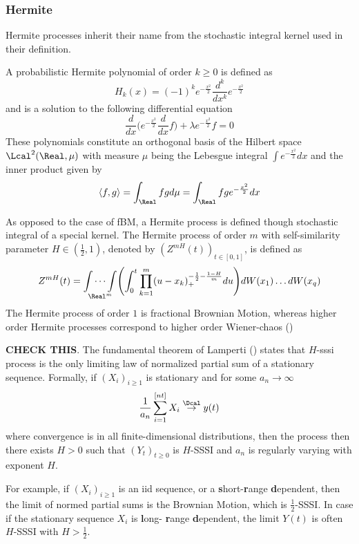 
\subsubsection{Hermite} %
\label{ssub:hermite}

Hermite processes inherit their name from the stochastic integral kernel used
in their definition.

A probabilistic Hermite polynomial of order $k\geq0$ is defined as 
\[ H_k(x) = (-1)^k e^{-\frac{x^2}{2}} \frac{d^k}{dx^k} e^{-\frac{x^2}{2}} \]
and is a solution to the following differential equation
\[
 \frac{d}{dx}\biggl( e^{-\frac{x^2}{2}} \frac{d}{dx} f\biggr) + \lambda e^{-\frac{x^2}{2}} f = 0
\]
These polynomials constitute an orthogonal basis of the Hilbert space $\Lcal^2(\Real, \mu)$
with measure $\mu$ being the Lebesgue integral $\int e^{-\frac{x^2}{2}} dx$ and the inner
product given by
\[
\langle f, g\rangle = \int_\Real f g d\mu = \int_\Real f g e^{-\frac{x^2}{2}} dx
\]

As opposed to the case of fBM, a Hermite process is defined though stochastic
integral of a special kernel. The Hermite process of order $m$ with self-similarity
parameter $H\in(\tfrac{1}{2},1)$, denoted by $(Z^{mH}(t))_{t\in[0,1]}$, is defined as 
\[
Z^{mH}(t) = \underset{\Real^m}{\int \cdots \int} \Biggl(
\int^t_0 \prod_{k=1}^m (u-x_k)_+^{-\frac{1}{2}-\frac{1-H}{m}} du\Biggr) dW(x_1) \ldots dW(x_q)
\]
The Hermite process of order $1$ is fractional Brownian Motion, whereas higher order
Hermite processes correspond to higher order Wiener-chaos (\cite{Bai20141710})

\noindent\textbf{CHECK THIS}.
The fundamental theorem of Lamperti (\cite{lamperti}) states that $H$-sssi process
is the only limiting law of normalized partial sum of a stationary sequence.
Formally, if $(X_i)_{i\geq1}$ is stationary and for some $a_n\to \infty$
\[ \frac{1}{a_n} \sum_{i=1}^{[nt]} X_i \overset{\Dcal}{\rightarrow} y(t) \]
where convergence is in all finite-dimensional distributions, then the process
then there  exists $H>0$ such that $(Y_t)_{t\geq0}$ is $H$-SSSI and $a_n$ is regularly
varying with exponent $H$.

For example, if $(X_i)_{i\geq 1}$ is an iid sequence, or a \textbf{s}hort-\textbf{r}ange
\textbf{d}ependent, then the limit of normed partial sums is the Brownian Motion,
which is $\frac{1}{2}$-SSSI. In case if the stationary sequence $X_i$ is \textbf{l}ong-
\textbf{r}ange \textbf{d}ependent, the limit $Y(t)$ is often $H$-SSSI with $H>\frac{1}{2}$.



